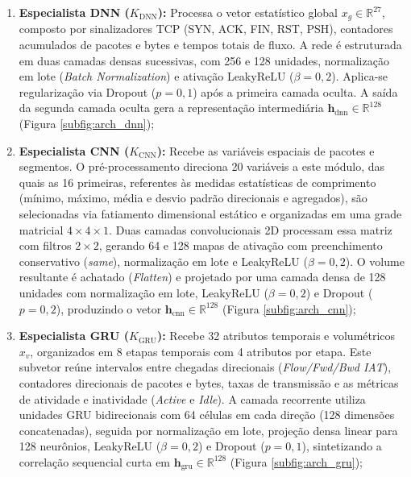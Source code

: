 \begin{enumerate}
    \item \textbf{Especialista DNN ($K_{\mathrm{DNN}}$):}
    Processa o vetor estatístico global $x_g \in \mathbb{R}^{27}$, composto por sinalizadores TCP (SYN, ACK, FIN, RST,
    PSH), contadores acumulados de pacotes e bytes e tempos totais de fluxo. A rede é estruturada em duas camadas
    densas sucessivas, com 256 e 128 unidades, normalização em lote (\emph{Batch Normalization}) e ativação LeakyReLU
    ($\beta = 0{,}2$). Aplica-se regularização via Dropout ($p = 0{,}1$) após a primeira camada oculta. A saída da
    segunda camada oculta gera a representação intermediária $\mathbf{h}_{\mathrm{dnn}} \in \mathbb{R}^{128}$
    (Figura \ref{subfig:arch_dnn});

    \item \textbf{Especialista CNN ($K_{\mathrm{CNN}}$):}
    Recebe as variáveis espaciais de pacotes e segmentos. O pré-processamento direciona 20 variáveis a este módulo, das
    quais as 16 primeiras, referentes às medidas estatísticas de comprimento (mínimo, máximo, média e desvio padrão
    direcionais e agregados), são selecionadas via fatiamento dimensional estático e organizadas em uma grade matricial
    $4 \times 4 \times 1$. Duas camadas convolucionais 2D processam essa matriz com filtros $2 \times 2$, gerando 64 e
    128 mapas de ativação com preenchimento conservativo (\emph{same}), normalização em lote e LeakyReLU
    ($\beta = 0{,}2$). O volume resultante é achatado (\emph{Flatten}) e projetado por uma camada densa de 128
    unidades com normalização em lote, LeakyReLU ($\beta = 0{,}2$) e Dropout ($p = 0{,}2$), produzindo o vetor
    $\mathbf{h}_{\mathrm{cnn}} \in \mathbb{R}^{128}$ (Figura \ref{subfig:arch_cnn});

    \item \textbf{Especialista GRU ($K_{\mathrm{GRU}}$):}
    Recebe 32 atributos temporais e volumétricos $x_v$, organizados em 8 etapas temporais com 4 atributos por etapa.
    Este subvetor reúne intervalos entre chegadas direcionais (\emph{Flow/Fwd/Bwd IAT}), contadores direcionais de
    pacotes e bytes, taxas de transmissão e as métricas de atividade e inatividade (\emph{Active} e \emph{Idle}). A
    camada recorrente utiliza unidades GRU bidirecionais com 64 células em cada direção (128 dimensões concatenadas),
    seguida por normalização em lote, projeção densa linear para 128 neurônios, LeakyReLU ($\beta = 0{,}2$) e Dropout
    ($p = 0{,}1$), sintetizando a correlação sequencial curta em $\mathbf{h}_{\mathrm{gru}} \in \mathbb{R}^{128}$
    (Figura \ref{subfig:arch_gru});


\end{enumerate}
